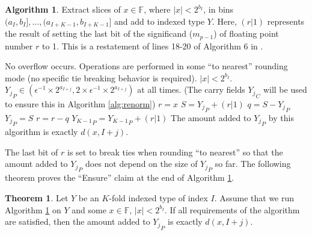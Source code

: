 \documentclass[12pt]{article}
\providecommand{\F}{\ensuremath{\mathbb{F}}}
\providecommand{\To}{\ensuremath{\text{ to }}}
\theoremstyle{definition}
\newtheorem{thm}{Theorem}[section]
\newtheorem{alg}{Algorithm}[section]
\numberwithin{equation}{section}
\numberwithin{figure}{section}
\begin{document}
      \begin{samepage}
      \begin{alg}
        Extract slices of $x \in \F$, where $|x| < 2^{b_I}$, in bins $(a_I, b_I], ..., (a_{I + K - 1}, b_{I + K - 1}]$ and add to indexed type $Y$. Here, $(r | 1)$ represents the result of setting the last bit of the significand ($m_{p - 1}$) of floating point number $r$ to 1. This is a restatement of lines 18-20 of Algorithm $6$ in \cite{repsum}.
        \begin{algorithmic}[1]
          \Require
          \Statex No overflow occurs.
          \Statex Operations are performed in some ``to nearest'' rounding mode (no specific tie breaking behavior is required).
          \Statex $|x| < 2^{b_I}$.
          \Statex ${Y_j}_P \in (\epsilon^{-1} \times 2^{a_{I + j}}, 2 \times \epsilon^{-1} \times 2^{a_{I + j}})$ at all times. (The carry fields ${Y_j}_C$ will be used to ensure this in Algorithm \ref{alg:renorm})
            \State $r = x$ \label{alg:depositrestricted:rgetsx}
            \For{$j = 0 \To (K - 2)$} \label{alg:depositrestricted:loop}
              \State $S = {Y_j}_P + (r | 1)$ \label{alg:depositrestricted:split}
              \State $q = S - {Y_j}_P$
              \State ${Y_j}_P = S$
              \State $r = r - q$\label{alg:depositrestricted:endsplit}
            \EndFor
            \State ${Y_{K - 1}}_P = {Y_{K - 1}}_P + (r | 1)$
          \EndFunction
          \Ensure
          \Statex The amount added to ${Y_j}_P$ by this algorithm is exactly $d(x, I + j)$.
        \end{algorithmic}
        \label{alg:depositrestricted}
      \end{alg}
      \end{samepage}

      The last bit of $r$ is set to break ties when rounding ``to nearest'' so that the amount added to ${Y_j}_P$ does not depend on the size of ${Y_j}_P$ so far. The following theorem proves the ``Ensure'' claim at the end of Algorithm \ref{alg:depositrestricted}.

    \begin{samepage}
      \begin{thm}
        Let $Y$ be an $K$-fold indexed type of index $I$. Assume that we run Algorithm \ref{alg:depositrestricted} on $Y$ and some $x \in \F$, $|x| < 2^{b_I}$. If all requirements of the algorithm are satisfied, then the amount added to ${Y_j}_P$ is exactly $d(x, I + j)$.
        \label{thm:ddepositrestricted}
      \end{thm}
    \end{samepage}
\end{document}
